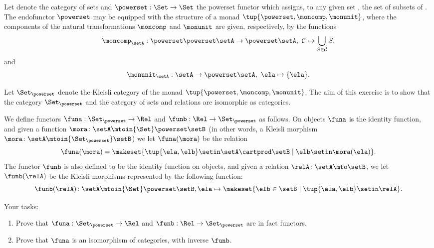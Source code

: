\begin{gradedexercise}
\label{ex:HwkRelKleisli}

Let \Set denote the category of sets and $\powerset : \Set \to \Set$ the powerset functor which assigns, to any given set \setA, the set of subsets of \setA.
The endofunctor $\powerset$ may be equipped with the structure of a monad $\tup{\powerset, \moncomp, \monunit}$, where the components of the natural transformations $\moncomp$ and $\monunit$ are given, respectively, by the functions
\begin{equation}
\moncomp_{\setA} : \powerset \powerset \setA \to \powerset \setA, \ \mathcal{C} \mapsto \bigcup_{S \in \mathcal{C}} S.
\end{equation}
and
\begin{equation}
\monunit_{\setA} : \setA \to \powerset \setA, \ \ela \mapsto \{ \ela \}.
\end{equation}

Let $\Set_{\powerset}$ denote the Kleisli category of the monad $\tup{\powerset, \moncomp, \monunit}$. The aim of this  exercise is to show that the category $\Set_{\powerset}$ and the category \Rel of sets and relations are isomorphic as categories. 

We define functors $\funa: \Set_{\powerset} \to \Rel$ and $\funb: \Rel \to \Set_{\powerset}$ as follows. On objects $\funa$ is the identity function, and given a function $\mora \colon \setA \mtoin{\Set} \powerset \setB$ (in other words, a Kleisli morphism $\mora \colon \setA \mtoin{\Set_{\powerset}} \setB$) we let $\funa(\mora)$ be the relation 
\begin{equation}
\funa(\mora) = \makeset{\tup{\ela, \elb} \setin \setA \cartprod \setB \mid \elb \setin \mora(\ela)}.
\end{equation}
The functor $\funb$ is also defined to be the identity function on objects, and given a relation $\relA \colon \setA \mto \setB$, we let $\funb(\relA)$ be the Kleisli morphisms represented by the following function: 
\begin{equation}
\funb(\relA)\colon \setA \mtoin{\Set} \powerset \setB, \ela \mapsto \makeset{\elb \in \setB \mid \tup{\ela, \elb} \setin \relA}.
\end{equation}

Your tasks:
\begin{enumerate}
\item Prove that $\funa: \Set_{\powerset} \to \Rel$ and $\funb: \Rel \to \Set_{\powerset}$ are in fact functors.
\item Prove that $\funa$ is an isomorphism of categories, with inverse $\funb$.
\end{enumerate}
\end{gradedexercise}


